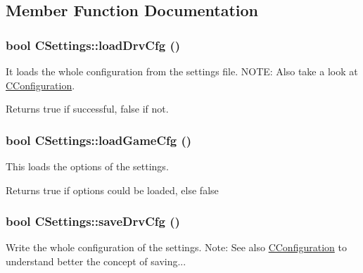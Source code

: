 \subsection{Member Function Documentation}
\hypertarget{class_c_settings_a6430e6cc3f4b46b028a95510d70a510d}{
\subsubsection[{loadDrvCfg}]{\setlength{\rightskip}{0pt plus 5cm}bool CSettings::loadDrvCfg ()}}
\label{class_c_settings_a6430e6cc3f4b46b028a95510d70a510d}


It loads the whole configuration from the settings file. NOTE: Also take a look at \hyperlink{class_c_configuration}{CConfiguration}. 

\begin{DoxyReturn}{Returns}
true if successful, false if not. 
\end{DoxyReturn}
\hypertarget{class_c_settings_ab74fc80043caf8db7b36e903d54dd9ae}{
\subsubsection[{loadGameCfg}]{\setlength{\rightskip}{0pt plus 5cm}bool CSettings::loadGameCfg ()}}
\label{class_c_settings_ab74fc80043caf8db7b36e903d54dd9ae}


This loads the options of the settings. 

\begin{DoxyReturn}{Returns}
true if options could be loaded, else false 
\end{DoxyReturn}
\hypertarget{class_c_settings_a1719f6bb6c031a3b55ea67cd394c5b66}{
\subsubsection[{saveDrvCfg}]{\setlength{\rightskip}{0pt plus 5cm}bool CSettings::saveDrvCfg ()}}
\label{class_c_settings_a1719f6bb6c031a3b55ea67cd394c5b66}


Write the whole configuration of the settings. Note: See also \hyperlink{class_c_configuration}{CConfiguration} to understand better the concept of saving... 


